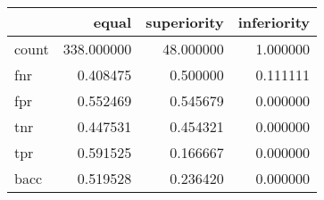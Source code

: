 \begin{tabular}{lrrr}
\toprule
{} &       equal &  superiority &  inferiority \\
\midrule
count &  338.000000 &    48.000000 &     1.000000 \\
fnr   &    0.408475 &     0.500000 &     0.111111 \\
fpr   &    0.552469 &     0.545679 &     0.000000 \\
tnr   &    0.447531 &     0.454321 &     0.000000 \\
tpr   &    0.591525 &     0.166667 &     0.000000 \\
bacc  &    0.519528 &     0.236420 &     0.000000 \\
\bottomrule
\end{tabular}
